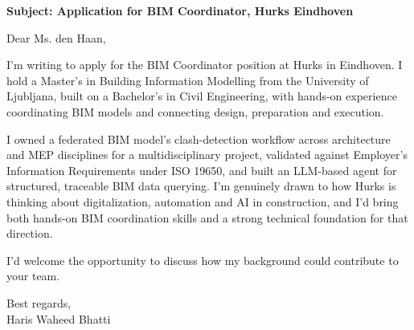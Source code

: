 \documentclass[a4paper,11pt]{article}
\begin{document}
\textbf{Subject: Application for BIM Coordinator, Hurks Eindhoven}

Dear Ms. den Haan,

I'm writing to apply for the BIM Coordinator position at Hurks in Eindhoven. I hold a Master's in Building Information Modelling from the University of Ljubljana, built on a Bachelor's in Civil Engineering, with hands-on experience coordinating BIM models and connecting design, preparation and execution.

I owned a federated BIM model's clash-detection workflow across architecture and MEP disciplines for a multidisciplinary project, validated against Employer's Information Requirements under ISO 19650, and built an LLM-based agent for structured, traceable BIM data querying. I'm genuinely drawn to how Hurks is thinking about digitalization, automation and AI in construction, and I'd bring both hands-on BIM coordination skills and a strong technical foundation for that direction.

I'd welcome the opportunity to discuss how my background could contribute to your team.

Best regards,\\
Haris Waheed Bhatti
\end{document}
